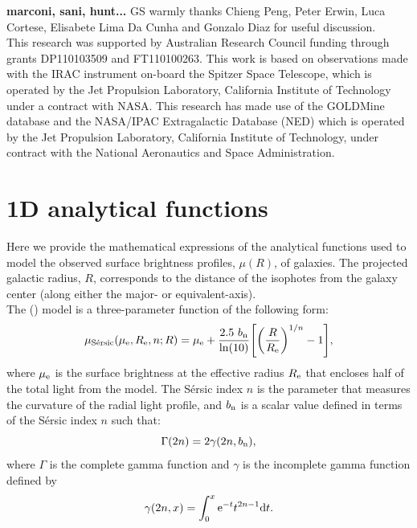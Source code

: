 \documentclass[preprint2]{emulateapj}
\begin{document}



\acknowledgments
{\bf marconi, sani, hunt...}
GS warmly thanks Chieng Peng, Peter Erwin, Luca Cortese, Elisabete Lima Da Cunha and Gonzalo Diaz 
for useful discussion. \\
This research was supported by Australian Research Council funding through grants
DP110103509 and FT110100263.
This work is based on observations made with the IRAC instrument \citep{fazio2004IRAC} 
on-board the Spitzer Space Telescope, 
which is operated by the Jet Propulsion Laboratory, 
California Institute of Technology under a contract with NASA.
This research has made use of the GOLDMine database \citep{goldmine} and the NASA/IPAC Extragalactic Database (NED) 
which is operated by the Jet Propulsion Laboratory, California Institute of Technology, 
under contract with the National Aeronautics and Space Administration. 

\appendix

\section{1D analytical functions}
\label{sec:app1}
Here we provide the mathematical expressions of the analytical functions used to model 
the observed surface brightness profiles, $\mu(R)$, of galaxies.
The projected galactic radius, $R$,
corresponds to the distance of the isophotes from the galaxy center (along either the major- or equivalent-axis). \\

The \citeauthor{sersic1963} (\citeyear{sersic1963,sersic1968}) model is a three-parameter function of the following form:
\begin{equation}
\mu_{\rm S\acute{e}rsic}(\mu_{\rm e},R_{\rm e},n;R) = \mu_{\rm e} + \frac{2.5~b_{\rm n}}{\ln(10)} 
\Biggl[\biggl(\frac{R}{R_{\rm e}}\biggr)^{1/n}-1\Biggr] ,
\end{equation}
\citep{caon1993,andredakis1995,grahamdriver2005}
where $\mu_{\rm e}$ is the surface brightness at the effective radius $R_{\rm e}$ that encloses 
half of the total light from the model. 
The S\'ersic index $n$ is the parameter that measures the curvature of the radial light profile,
and $b_{\rm n}$ is a scalar value defined in terms of the S\'ersic index $n$ such that:
\begin{equation}
\Gamma(2n) = 2\gamma(2n,b_{\rm n}),
\end{equation}
where $\Gamma$ is the complete gamma function \citep{ciotti1991} 
and $\gamma$ is the incomplete gamma function defined by 
\begin{equation}
\gamma(2n,x) = \int_{0}^{x} {\rm e}^{-t} t^{2n-1} {\rm d}t .
\end{equation} \\
\end{document}
